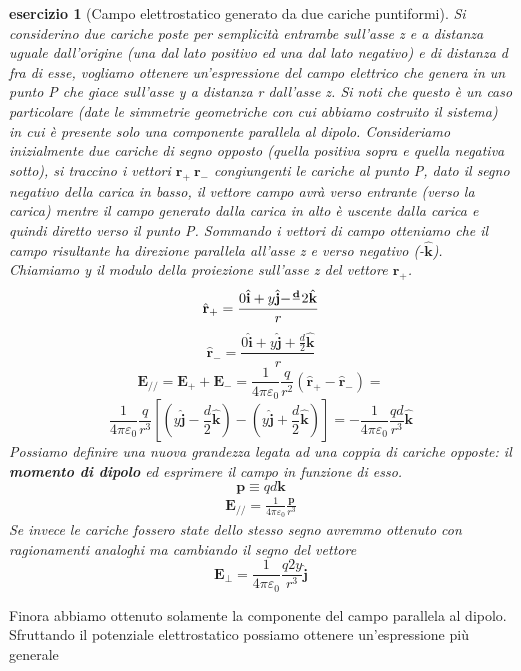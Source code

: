 \documentclass[10pt,a4paper]{article}
\newtheorem{esercizio}{esercizio}
\begin{document}
\begin{esercizio}[Campo elettrostatico generato da due cariche puntiformi]
	Si considerino due cariche poste per semplicità entrambe sull'asse z e a distanza uguale dall'origine (una dal lato positivo ed una dal lato negativo) e di distanza d fra di esse, vogliamo ottenere un'espressione del campo elettrico che genera in un punto P che giace sull'asse y a distanza r dall'asse z. Si noti che questo è un caso particolare (date le simmetrie geometriche con cui abbiamo costruito il sistema) in cui è presente solo una componente parallela al dipolo. Consideriamo inizialmente due cariche di segno opposto (quella positiva sopra e quella negativa sotto), si traccino i vettori \(\mathbf{r}_+ \ \mathbf{r}_- \) congiungenti le cariche al punto P, dato il segno negativo della carica in basso, il vettore campo avrà verso entrante (verso la carica) mentre il campo generato dalla carica in alto è uscente dalla carica e quindi diretto verso il punto P. Sommando i vettori di campo otteniamo che il campo risultante ha direzione parallela all'asse z e verso negativo (-$\hat{\mathbf{k}}$). Chiamiamo y il modulo della proiezione sull'asse z del vettore $\mathbf{r}_+$.
	\[\hat{\mathbf{r}}_+ =\frac{ 0\hat{\mathbf{i}}+y \hat{\mathbf{j}}\mathbf{-\frac{d}}{2}\hat{\mathbf{k}}}{r}\]
	\[\hat{\mathbf{r}}_- = \frac{0\hat{\mathbf{i}}+y \hat{\mathbf{j}}+\frac{d}{2}\hat{\mathbf{k}}}{r}\]
	\[\mathbf{E}_{//} = \mathbf{E}_{+} + \mathbf{E}_{-} = \frac{1}{4\pi\varepsilon_0}\frac{q}{r^2}\left(\hat{\mathbf{r}}_+-\hat{\mathbf{r}}_-\right)=\]
	\[\frac{1}{4\pi\varepsilon_0}\frac{q}{r^3}\left[(y\hat{\mathbf{j}}-\frac{d}{2}\hat{\mathbf{k}})-(y\hat{\mathbf{j}}+\frac{d}{2}\hat{\mathbf{k}})\right]= -\frac{1}{4\pi\varepsilon_0}\frac{q d}{r^3}\hat{\mathbf{k}}\]
	Possiamo definire una nuova grandezza legata ad una coppia di cariche opposte: il \textbf{momento di dipolo} ed esprimere il campo in funzione di esso.
	\[\mathbf{p} \equiv qd\mathbf{k}\]
	\begin{align}\label{eq:campo_dipolo}
		\mathbf{E}_{//} = \frac{1}{4\pi\varepsilon_0}\frac{\mathbf{p}}{r^3}
	\end{align}
	Se invece le cariche fossero state dello stesso segno avremmo ottenuto con ragionamenti analoghi ma cambiando il segno del vettore
	\[\mathbf{E}_{\perp} = \frac{1}{4\pi\varepsilon_0}\frac{q2y}{r^3}\hat{\mathbf{j}}\]
\end{esercizio}
Finora abbiamo ottenuto solamente la componente del campo parallela al dipolo. Sfruttando il potenziale elettrostatico possiamo ottenere un'espressione più generale
\end{document}
